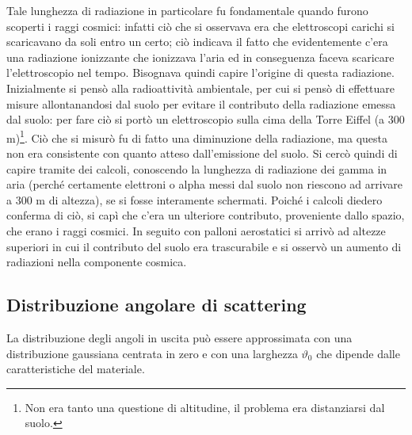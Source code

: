 Tale lunghezza di radiazione in particolare fu fondamentale quando furono scoperti i raggi cosmici: infatti ciò che si osservava era che elettroscopi carichi si scaricavano da soli entro un certo; ciò indicava il fatto che evidentemente c'era una radiazione ionizzante che ionizzava l'aria ed in conseguenza faceva scaricare l'elettroscopio nel tempo. Bisognava quindi capire l'origine di questa radiazione. Inizialmente si pensò alla radioattività ambientale, per cui si pensò di effettuare misure allontanandosi dal suolo per evitare il contributo della radiazione emessa dal suolo: per fare ciò si portò un elettroscopio sulla cima della Torre Eiffel (a 300 m)\footnote{Non era tanto una questione di altitudine, il problema era distanziarsi dal suolo.}. Ciò che si misurò fu di fatto una diminuzione della radiazione, ma questa non era consistente con quanto atteso dall'emissione del suolo. Si cercò quindi di capire tramite dei calcoli, conoscendo la lunghezza di radiazione dei gamma in aria (perché certamente elettroni o alpha messi dal suolo non riescono ad arrivare a 300 m di altezza), se si fosse interamente schermati. Poiché i calcoli diedero conferma di ciò, si capì che c'era un ulteriore contributo, proveniente dallo spazio, che erano i raggi cosmici. In seguito con palloni aerostatici si arrivò ad altezze superiori in cui il contributo del suolo era trascurabile e si osservò un aumento di radiazioni nella componente cosmica.

\subsection{Distribuzione angolare di scattering}
La distribuzione degli angoli in uscita può essere approssimata con una distribuzione gaussiana centrata in zero e con una larghezza $\vartheta_0$ che dipende dalle caratteristiche del materiale.

